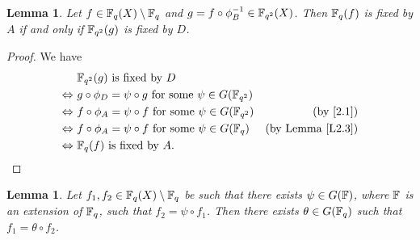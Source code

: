 \documentclass{amsart}
\newtheorem{lem}[thm]{Lemma}
\numberwithin{equation}{section}
\theoremstyle{definition}
\newcommand{\f}{\Bbb F}
\begin{document}
\begin{lem}\label{L2.2}
Let $f\in\f_q(X)\setminus\f_q$ and $g=f\circ\phi_B^{-1}\in\f_{q^2}(X)$. Then $\f_q(f)$ is fixed by $A$ if and only if $\f_{q^2}(g)$ is fixed by $D$.
\end{lem}

\begin{proof}
We have 
\begin{align*}
& \f_{q^2}(g)\ \text{is fixed by}\ D\cr
\Leftrightarrow\ &g\circ\phi_D=\psi\circ g\ \text{for some}\ \psi\in G(\f_{q^2})\cr
\Leftrightarrow\ &f\circ\phi_A=\psi\circ f\ \text{for some}\ \psi\in G(\f_{q^2})&\text{(by \eqref{2.1})}\cr
\Leftrightarrow\ &f\circ\phi_A=\psi\circ f\ \text{for some}\ \psi\in G(\f_{q})&\text{(by Lemma~\ref{L2.3})}\cr
\Leftrightarrow\ &\f_q(f)\ \text{is fixed by}\ A.&
\end{align*}
\end{proof}

\begin{lem}\label{L2.3}
Let $f_1,f_2\in\f_q(X)\setminus\f_q$ be such that there exists $\psi\in G(\f)$, where $\f$ is an extension of $\f_q$, such that $f_2=\psi\circ f_1$. Then there exists $\theta\in G(\f_q)$ such that $f_1=\theta\circ f_2$.
\end{lem}
\end{document}
